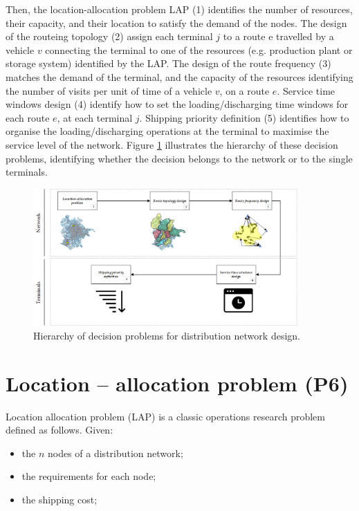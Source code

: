 Then, the location-allocation problem LAP (1) identifies the number of resources, their capacity, and their location to satisfy the demand of the nodes. The design of the routeing topology (2) assign each terminal $j$ to a route e travelled by a vehicle $v$ connecting the terminal to one of the resources (e.g. production plant or storage system) identified by the LAP. The design of the route frequency (3) matches the demand of the terminal, and the capacity of the resources identifying the number of visits per unit of time of a vehicle $v$, on a route $e$. Service time windows design (4) identify how to set the loading/discharging time windows for each route $e$, at each terminal $j$. Shipping priority definition (5) identifies how to organise the loading/discharging operations at the terminal to maximise the service level of the network. Figure \ref{fig_network_design} illustrates the hierarchy of these decision problems, identifying whether the decision belongs to the network or to the single terminals.

\begin{figure}[hbt!]
\centering
\includegraphics[width=0.9\textwidth]{SectionDistribution/design_figures/fig_network_design.png}
\captionsetup{type=figure}
\caption{Hierarchy of decision problems for distribution network design.}
\label{fig_network_design}
\end{figure}

\section{Location – allocation problem  (P6)}
Location allocation problem (LAP) is a classic operations research problem defined as follows.
Given:
\begin{itemize}
    \item the $n$ nodes of a distribution network;
	\item the requirements for each node;
	\item the shipping cost;
\end{itemize}

